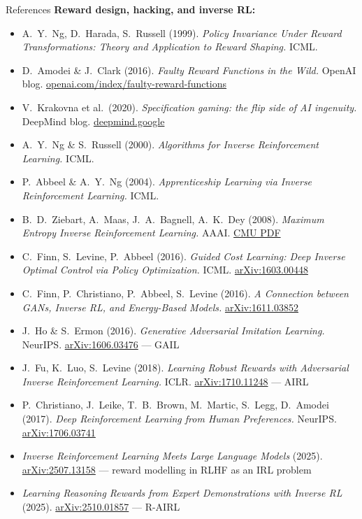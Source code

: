 \begin{frame}[allowframebreaks]{References}
\textbf{Reward design, hacking, and inverse RL:}
\begin{itemize}
    \item A.~Y.~Ng, D.~Harada, S.~Russell (1999). \emph{Policy Invariance Under Reward Transformations: Theory and Application to Reward Shaping.} ICML.
    \item D.~Amodei \& J.~Clark (2016). \emph{Faulty Reward Functions in the Wild.} OpenAI blog. \href{https://openai.com/index/faulty-reward-functions/}{openai.com/index/faulty-reward-functions}
    \item V.~Krakovna et al.\ (2020). \emph{Specification gaming: the flip side of AI ingenuity.} DeepMind blog. \href{https://deepmind.google/blog/specification-gaming-the-flip-side-of-ai-ingenuity/}{deepmind.google}
    \item A.~Y.~Ng \& S.~Russell (2000). \emph{Algorithms for Inverse Reinforcement Learning.} ICML.
    \item P.~Abbeel \& A.~Y.~Ng (2004). \emph{Apprenticeship Learning via Inverse Reinforcement Learning.} ICML.
    \item B.~D.~Ziebart, A.~Maas, J.~A.~Bagnell, A.~K.~Dey (2008). \emph{Maximum Entropy Inverse Reinforcement Learning.} AAAI. \href{https://www.cs.cmu.edu/~bziebart/publications/maximum-entropy-inverse-reinforcement-learning.html}{CMU PDF}
    \item C.~Finn, S.~Levine, P.~Abbeel (2016). \emph{Guided Cost Learning: Deep Inverse Optimal Control via Policy Optimization.} ICML. \href{https://arxiv.org/abs/1603.00448}{arXiv:1603.00448}
    \item C.~Finn, P.~Christiano, P.~Abbeel, S.~Levine (2016). \emph{A Connection between GANs, Inverse RL, and Energy-Based Models.} \href{https://arxiv.org/abs/1611.03852}{arXiv:1611.03852}
    \item J.~Ho \& S.~Ermon (2016). \emph{Generative Adversarial Imitation Learning.} NeurIPS. \href{https://arxiv.org/abs/1606.03476}{arXiv:1606.03476} --- GAIL
    \item J.~Fu, K.~Luo, S.~Levine (2018). \emph{Learning Robust Rewards with Adversarial Inverse Reinforcement Learning.} ICLR. \href{https://arxiv.org/abs/1710.11248}{arXiv:1710.11248} --- AIRL
    \item P.~Christiano, J.~Leike, T.~B.~Brown, M.~Martic, S.~Legg, D.~Amodei (2017). \emph{Deep Reinforcement Learning from Human Preferences.} NeurIPS. \href{https://arxiv.org/abs/1706.03741}{arXiv:1706.03741}
    \item \emph{Inverse Reinforcement Learning Meets Large Language Models} (2025). \href{https://arxiv.org/abs/2507.13158}{arXiv:2507.13158} --- reward modelling in RLHF as an IRL problem
    \item \emph{Learning Reasoning Rewards from Expert Demonstrations with Inverse RL} (2025). \href{https://arxiv.org/abs/2510.01857}{arXiv:2510.01857} --- R-AIRL
\end{itemize}
\end{frame}
